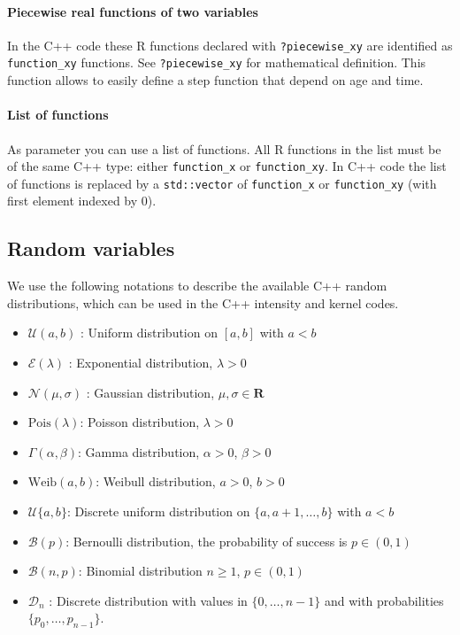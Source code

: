\hypertarget{piecewise-real-functions-of-two-variables}{%
\paragraph{Piecewise real functions of two variables}\label{piecewise-real-functions-of-two-variables}}

In the C++ code these R functions declared with \texttt{?piecewise\_xy} are identified as \texttt{function\_xy} functions. See \texttt{?piecewise\_xy} for mathematical definition. This function allows to easily define a step function that depend on age and time.

\hypertarget{list-of-functions}{%
\paragraph{List of functions}\label{list-of-functions}}

As parameter you can use a list of functions. All R functions in the list must be of the same C++ type: either \texttt{function\_x} or \texttt{function\_xy}. In C++ code the list of functions is replaced by a \texttt{std::vector} of \texttt{function\_x} or \texttt{function\_xy} (with first element indexed by 0).

\hypertarget{randomvar}{%
\subsection{Random variables}\label{randomvar}}

We use the following notations to describe the available C++ random distributions, which can be used in the C++ intensity and kernel codes.

\begin{itemize}
\item
  \(\mathcal{U}(a,b)\) : Uniform distribution on \([a, b]\) with \(a < b\)
\item
  \(\mathcal{E}(\lambda)\) : Exponential distribution, \(\lambda > 0\)
\item
  \(\mathcal{N}(\mu,\sigma)\) : Gaussian distribution, \(\mu, \sigma \in \mathbf{R}\)
\item
  \(\mathrm{Pois}(\lambda)\): Poisson distribution, \(\lambda > 0\)
\item
  \(\Gamma(\alpha, \beta)\): Gamma distribution, \(\alpha > 0\), \(\beta > 0\)
\item
  \(\mathrm{Weib}(a, b)\): Weibull distribution, \(a > 0\), \(b > 0\)
\item
  \(\mathcal{U}\{a, b\}\): Discrete uniform distribution on \(\{a, a+1, \dots, b\}\) with \(a < b\)
\item
  \(\mathcal{B}(p)\): Bernoulli distribution, the probability of success is \(p \in (0,1)\)
\item
  \(\mathcal{B}(n, p)\): Binomial distribution \(n \ge 1\), \(p \in (0,1)\)
\item
  \(\mathcal{D}_n\) : Discrete distribution with values in \(\{ 0, \dots, n-1 \}\) and with probabilities \(\{p_0, \dots, p_{n-1}\}\).
\end{itemize}

